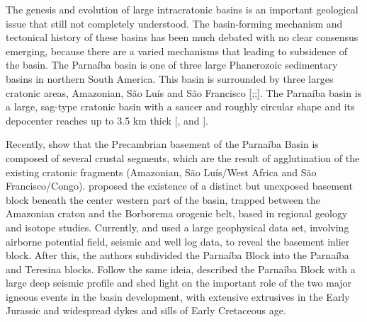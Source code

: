 \documentclass[paper,11pt]{geophysics}
\begin{document}

\bigskip 


The genesis and evolution of large intracratonic basins is an important geological issue that still not completely understood. The basin-forming mechanism and tectonical history of these basins has been much debated with no clear consensus emerging, because there are a varied mechanisms that leading to subsidence of the basin. The Parnaíba basin is one of three large Phanerozoic sedimentary basins in northern South America. This basin is surrounded by three	 larges cratonic areas, Amazonian, São Luís and São Francisco [\cite{de_almeida_brazilian_1981};\cite{de_brito_neves_neoproterozoic_2013};\cite{cordani_significance_2013}]. The Parnaíba basin is a large, sag-type cratonic basin with a saucer and roughly circular shape and its depocenter reaches up to 3.5 km thick [\cite{goes_feijo_1994}, \cite{vaz_bacia_2007} and \cite{daly_brasiliano_2014}].

Recently, \cite{fuck_rodinia_2008} show that the Precambrian basement of the Parnaíba Basin is composed of several crustal segments, which are the result of agglutination of the existing cratonic fragments (Amazonian, São Luís/West Africa and São Francisco/Congo). \cite{de_brito_neves_influence_1984} proposed the existence of a distinct but unexposed basement block beneath the center western part of the basin, trapped between the Amazonian craton and the Borborema orogenic belt, based in regional geology and isotope studies. Currently, \cite{de_castro_crustal_2014} and \cite{de_castro_geophysical_2016} used a large geophysical data set, involving airborne potential field, seismic and well log data, to reveal the basement inlier block. After this, the authors subdivided the Parnaíba Block into the Parnaíba and Teresina blocks. Follow the same ideia, \cite{daly_brasiliano_2014} described the Parnaíba Block with a large deep seismic profile and shed light on the important role of the two major igneous events in the basin development, with extensive extrusives in the Early Jurassic and widespread dykes and sills of Early Cretaceous age.
\end{document}

